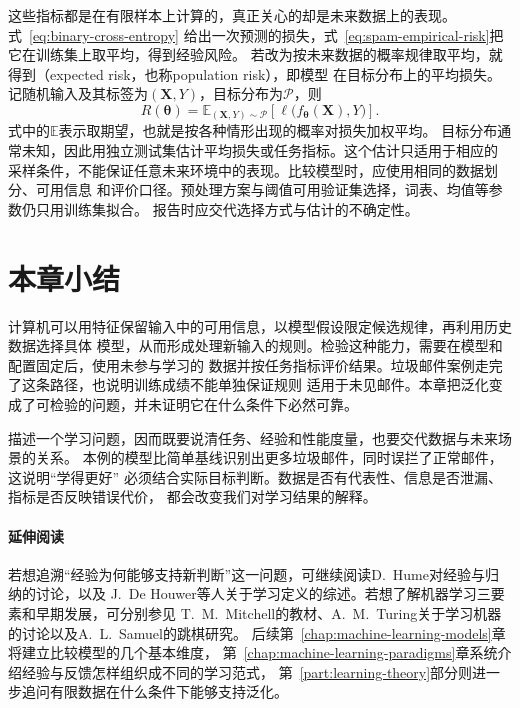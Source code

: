 这些指标都是在有限样本上计算的，真正关心的却是未来数据上的表现。式~\eqref{eq:binary-cross-entropy}
给出一次预测的损失，式~\eqref{eq:spam-empirical-risk}把它在训练集上取平均，得到经验风险。
若改为按未来数据的概率规律取平均，就得到（expected risk，也称population
risk），即模型
在目标分布上的平均损失。记随机输入及其标签为$(\bm{X},Y)$，目标分布为$\mathcal{P}$，则
\begin{equation}
  R(\bm{\theta})
  =\mathbb{E}_{(\bm{X},Y)\sim\mathcal{P}}
  \left[\ell\bigl(f_{\bm{\theta}}(\bm{X}),Y\bigr)\right].
  \label{eq:expected-risk}
\end{equation}
式中的$\mathbb{E}$表示取期望，也就是按各种情形出现的概率对损失加权平均。
目标分布通常未知，因此用独立测试集估计平均损失或任务指标。这个估计只适用于相应的
采样条件，不能保证任意未来环境中的表现。比较模型时，应使用相同的数据划分、可用信息
和评价口径。预处理方案与阈值可用验证集选择，词表、均值等参数仍只用训练集拟合。
报告时应交代选择方式与估计的不确定性。

\section{本章小结}
\label{sec:introduction-summary}

计算机可以用特征保留输入中的可用信息，以模型假设限定候选规律，再利用历史数据选择具体
模型，从而形成处理新输入的规则。检验这种能力，需要在模型和配置固定后，使用未参与学习的
数据并按任务指标评价结果。垃圾邮件案例走完了这条路径，也说明训练成绩不能单独保证规则
适用于未见邮件。本章把泛化变成了可检验的问题，并未证明它在什么条件下必然可靠。

描述一个学习问题，因而既要说清任务、经验和性能度量，也要交代数据与未来场景的关系。
本例的模型比简单基线识别出更多垃圾邮件，同时误拦了正常邮件，这说明“学得更好”
必须结合实际目标判断。数据是否有代表性、信息是否泄漏、指标是否反映错误代价，
都会改变我们对学习结果的解释。

\paragraph{延伸阅读}

若想追溯“经验为何能够支持新判断”这一问题，可继续阅读D.~Hume对经验与归纳的讨论，以及
J.~De Houwer等人关于学习定义的综述。若想了解机器学习三要素和早期发展，可分别参见
T.~M.~Mitchell的教材、A.~M.~Turing关于学习机器的讨论以及A.~L.~Samuel的跳棋研究。
后续第~\ref{chap:machine-learning-models}章将建立比较模型的几个基本维度，
第~\ref{chap:machine-learning-paradigms}章系统介绍经验与反馈怎样组织成不同的学习范式，
第~\ref{part:learning-theory}部分则进一步追问有限数据在什么条件下能够支持泛化。
